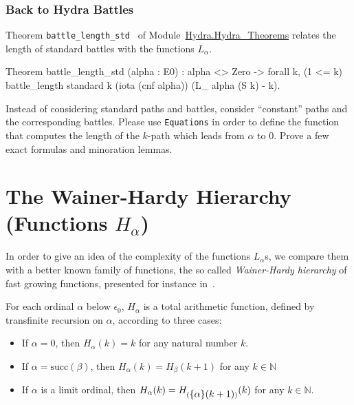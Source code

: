 \subsubsection{Back to Hydra Battles}

Theorem \texttt{battle\_length\_std } of
Module~\href{../theories/html/hydras.Hydra.Hydra_Theorems.html\#battle_length_std}{Hydra.Hydra\_Theorems} relates the length of standard battles with the functions $L_\alpha$.

\begin{Coqsrc}
Theorem battle_length_std (alpha : E0)  :
  alpha <> Zero ->
  forall k, (1 <= k)%
            battle_length standard k (iota (cnf alpha))
                         (L_ alpha (S k) - k).
\end{Coqsrc}


\begin{project}
Instead of considering standard paths and battles, consider ``constant'' paths and the corresponding battles. Please use \texttt{Equations} in order to define the function that computes the length of the $k$-path which leads  from $\alpha$ to $0$.
Prove a few  exact formulas and minoration lemmas.
\end{project}

\section{The Wainer-Hardy Hierarchy (Functions \texorpdfstring{$H_\alpha$}{\texttt{H\_alpha}})}

\label{sect:hardy}
In order to give an idea of the complexity of the functions  $L_\alpha$s, we compare them with a better known family of functions, the so called \emph{Wainer-Hardy hierarchy} of fast growing functions,
presented for instance in~\cite{Promel2013}. 

For each ordinal $\alpha$ below $\epsilon_0$, $H_\alpha$ is a 
total arithmetic function, defined  by  transfinite recursion on $\alpha$, according to three cases:


\begin{itemize}
\item If $\alpha=0$, then $H_\alpha (k)= k$ for any natural number $k$.
\item If $\alpha=\textrm{succ}(\beta)$, then 
$H_\alpha(k)=H_\beta(k+1)$ for any $k \in \mathbb{N}$
\item If $\alpha$ is a limit ordinal, then 
$H_\alpha(k) = H_{(\mbox{$\{\alpha\}(k+1)$})}(k)$ for any $k\in \mathbb{N}$.
\end{itemize}

